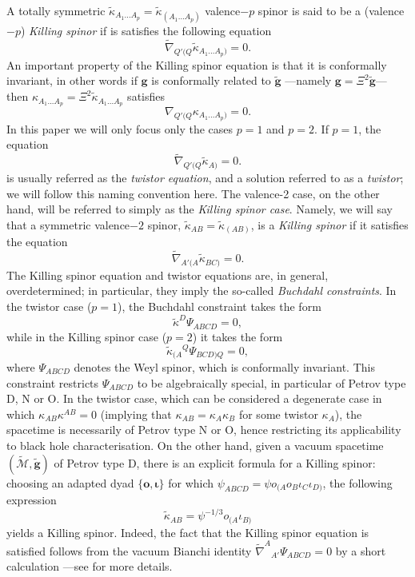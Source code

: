 \documentclass[10pt,a4paper]{article}
\theoremstyle{plain}
\def\bmg{{\bm g}}
\def\bmo{{\bm o}}
\begin{document}
A totally symmetric
$\tilde{\kappa}_{A_1...A_p}=\tilde{\kappa}_{(A_1...A_p)}$ valence$-p$
spinor is said to be a (valence$-p$) \emph{Killing spinor} if is
satisfies the following equation
\begin{equation}\label{qValenceKillingspinor}
\tilde{\nabla}_{Q'(Q}\tilde{\kappa}_{A_1...A_p)}=0.
\end{equation}
An important property of the Killing spinor equation is that it is
conformally invariant, in other words if $\bmg$ is conformally related
to $\tilde{\bmg}$ ---namely $\bmg=\Xi^2\tilde{\bmg}$--- then
${\kappa}_{A_1...A_p}=\Xi^2 \tilde{\kappa}_{A_1...A_p}$ satisfies
\[{\nabla}_{Q'(Q}{\kappa}_{A_1...A_p)}=0.\]
\medskip
\noindent In this paper we will only focus only the cases $p=1$ and
$p=2$.  If $p=1$, the equation
\begin{equation}\label{TwistorEq}
  \tilde{\nabla}_{Q'(Q}\tilde{\kappa}_{A)}=0.
\end{equation}
is usually referred as the \emph{twistor equation}, and a solution
referred to as a \emph{twistor}; we will follow this naming convention
here.  The valence-2 case, on the other hand, will be referred to
simply as the \emph{Killing spinor case}.  Namely, we will say that a
symmetric valence$-2$ spinor,
$\tilde{\kappa}_{AB}=\tilde{\kappa}_{(AB)}$, is a \textit{Killing
  spinor} if it satisfies the equation
\begin{equation}
\tilde{\nabla}_{A'(A}\tilde{\kappa}_{BC)}=0.
\end{equation}
The Killing spinor equation and twistor equations are, in general,
overdetermined; in particular, they imply the so-called
\textit{Buchdahl constraints}.  In the twistor case ($p=1$), the Buchdahl constraint takes
the form
\[
\tilde{\kappa}^D\Psi_{ABCD}=0,
\]
while in the Killing spinor case ($p=2$) it takes the form
\[
\tilde{\kappa}_{(A}{}^Q\Psi_{BCD)Q}=0,
\]
where $\Psi_{ABCD}$ denotes the Weyl spinor, which is conformally invariant.
This constraint restricts $\Psi_{ABCD}$ to be algebraically special, in particular of Petrov type D, N or O. In the twistor case, which can be considered a degenerate case in which $\kappa_{AB}\kappa^{AB}=0$ (implying that $\kappa_{AB}=\kappa_A\kappa_B$ for some twistor $\kappa_A$), the spacetime is necessarily of Petrov type N or
O, hence restricting its applicability to black
hole characterisation. On the other hand, given a vacuum spacetime $(\tilde{\mathcal{M}},\tilde{\bmg})$ of Petrov type D,
there is an explicit
formula for a Killing spinor: choosing an adapted dyad $\lbrace \bmo,
\bm\iota\rbrace$ for which $\psi_{ABCD}=\psi
o_{(A}o_{B}\iota_C\iota_{D)}$, the following expression
\[\tilde{\kappa}_{AB} = \psi^{-1/3}o_{(A}\iota_{B)}\]
yields a Killing spinor. Indeed, the fact that the Killing spinor equation is
satisfied follows from the vacuum Bianchi identity
$\tilde{\nabla}^A{}_{A'}\Psi_{ABCD}=0$ by a short calculation ---see
\cite{PenRin84, WalkerPenrose70} for more details.
\medskip
\end{document}
